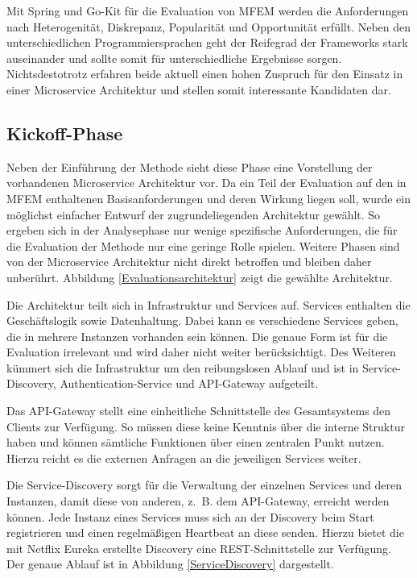 Mit Spring und Go-Kit für die Evaluation von \ac{MFEM} werden die Anforderungen nach Heterogenität, Diskrepanz, Popularität und Opportunität erfüllt. Neben den unterschiedlichen Programmiersprachen geht der Reifegrad der Frameworks stark auseinander und sollte somit für unterschiedliche Ergebnisse sorgen. Nichtsdestotrotz erfahren 
beide aktuell einen hohen Zuspruch für den Einsatz in einer Microservice Architektur und stellen somit interessante Kandidaten dar.

\subsection{Kickoff-Phase}

Neben der Einführung der Methode sieht diese Phase eine Vorstellung der vorhandenen Microservice Architektur vor.  
Da ein Teil der Evaluation auf den in \ac{MFEM} enthaltenen Basisanforderungen und deren Wirkung liegen soll, wurde ein möglichst einfacher Entwurf der zugrundeliegenden Architektur gewählt. So ergeben sich in der Analysephase nur wenige spezifische Anforderungen, die für die Evaluation der Methode nur eine geringe Rolle spielen. Weitere Phasen sind von der Microservice Architektur nicht direkt betroffen und bleiben daher unberührt. Abbildung \ref{Evaluationsarchitektur} zeigt die gewählte Architektur.


Die Architektur teilt sich in Infrastruktur und Services auf. Services enthalten die Ge\-schäfts\-logik sowie Datenhaltung. Dabei kann es verschiedene Services geben, die in mehrere Instanzen vorhanden sein können. Die genaue Form ist für die Evaluation irrelevant und wird daher nicht weiter berücksichtigt. Des Weiteren kümmert sich die Infrastruktur um den reibungslosen Ablauf und ist in Service-Discovery, Authentication-Service und API-Gateway aufgeteilt.

Das API-Gateway stellt eine einheitliche Schnittstelle des Gesamtsystems den Clients zur Verfügung. So müssen diese keine Kenntnis über die interne Struktur haben und können sämtliche Funktionen über einen zentralen Punkt nutzen. Hierzu reicht es die externen Anfragen an die jeweiligen Services weiter.

Die Service-Discovery sorgt für die Verwaltung der einzelnen Services und deren Instanzen, damit diese von anderen, z.~B. dem API-Gateway, erreicht werden können. Jede Instanz eines Services muss sich an der Discovery beim Start registrieren und einen regelmäßigen Heartbeat an diese senden. Hierzu bietet die mit Netflix Eureka erstellte Discovery eine \ac{REST}-Schnittstelle zur Verfügung. Der genaue Ablauf ist in Abbildung \ref{ServiceDiscovery} dargestellt.

